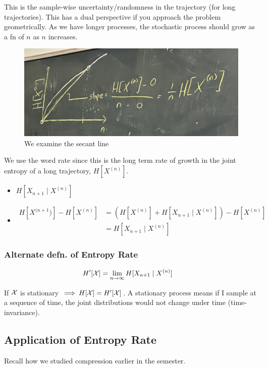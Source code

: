 This is the sample-wise uncertainty/randomness in the trajectory (for long trajectories). This has a dual perspective if you approach the problem geometrically. As we have longer processes, the stochastic process should grow as a fn of $n$ as $n$ increases.

\begin{figure}[H]
    \centering
    \includegraphics[scale=0.15]{lectures/wk11/img/entropy_increasing.jpg}
    \caption{We examine the secant line}
    \label{fig:enter-label}
\end{figure}

We use the word rate since this is the long term rate of growth in the joint entropy of a long trajectory, $H[X^{(n)}]$.

\begin{itemize}
\item $H[X_{n+1} \mid X^{(n)}]$
\item 
    \begin{align*}
    H[X^{(n+1})] - H[X^{(n)}] 
        &= (H[X^{(n)}]+H[X_{n+1}\mid X^{(n)}]) - H[X^{(n)}]
    \\
        &= H[X_{n+1}\mid X^{(n)}]
    \end{align*}
\end{itemize}

\subsubsection{Alternate defn. of Entropy Rate}
\begin{align*}
    H'[\mathcal{X}]
    &= \lim_{n\to\infty} H[X_{n+1} \mid X^{(n)}]
\end{align*}

If $\mathcal{X}$ is stationary $\implies H[\mathcal{X}]=H'[\mathcal{X}]$. A stationary process means if I sample at a sequence of time, the joint distributions would not change under time (time-invariance).

\subsection{Application of Entropy Rate}
Recall how we studied compression earlier in the semester.

